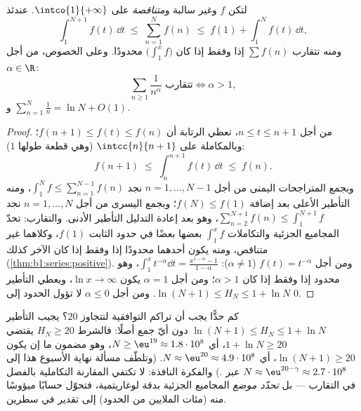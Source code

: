 \begin{theorem}\label{thm:b1:series:riemann}
لتكن $f$  وغير سالبة و\emph{متناقصة} على
$\intco{1}{+\infty}$. عندئذ
\[
\int_1^{N+1} f(t)\,\dd t \;\leq\; \sum_{n=1}^{N} f(n) \;\leq\; f(1)
+ \int_1^{N} f(t)\,\dd t ,
\]
ومنه تتقارب $\sum f(n)$ إذا وفقط إذا كان $\bigl(\int_1^x f\bigr)$ محدودًا. وعلى
الخصوص، من أجل $\alpha \in \R$:
\[
\sum_{n \geq 1} \frac{1}{n^\alpha} \text{ تتقارب}
\iff \alpha > 1,
\]
و $\sum_{n=1}^{N} \frac1n = \ln N + O(1)$.
\end{theorem}

\begin{proof}
من أجل $n \leq t \leq n+1$، تعطي الرتابة أن $f(n+1) \leq f(t)
\leq f(n)$؛ وبالمكاملة على $\intcc{n}{n+1}$ (وهي قطعة
طولها $1$):
\[
f(n+1) \;\leq\; \int_n^{n+1} f(t)\,\dd t \;\leq\; f(n) .
\]
وبجمع المتراجحات اليمنى من أجل $n = 1, \dots, N-1$ نجد
$\int_1^{N} f \leq \sum_{n=1}^{N-1} f(n)$، ومنه التأطير
الأعلى بعد إضافة $f(N) \leq f(1)$؛ وبجمع اليسرى من أجل
$n = 1, \dots, N$ نجد $\sum_{n=2}^{N+1} f(n) \leq
\int_1^{N+1} f$، وهو بعد إعادة التدليل التأطير الأدنى.
والتقارب: تحدّ المجاميع الجزئية والتكاملات $\int_1^x f$
بعضها بعضًا في حدود الثابت $f(1)$، وكلاهما
غير متناقص، ومنه يكون أحدهما محدودًا إذا وفقط إذا كان الآخر كذلك
(\cref{thm:b1:series:positive}). ومن أجل $f(t)
= t^{-\alpha}$ ($\alpha \neq 1$): $\int_1^x t^{-\alpha}\dd t =
\frac{x^{1-\alpha} - 1}{1 - \alpha}$، وهو محدود إذا وفقط إذا كان $\alpha > 1$؛ ومن أجل
$\alpha = 1$ يكون  $\ln x \to \infty$، ويعطي التأطير
$\ln(N+1) \leq H_N \leq 1 + \ln N$. ومن أجل $\alpha \leq 0$ لا تؤول
الحدود إلى $0$.
\end{proof}

\begin{example}\label{ex:b1:series:harmonicstack}
كم حدًّا يجب أن تراكم  التوافقية لتتجاوز $20$؟
يجيب التأطير $\ln(N+1) \leq H_N \leq 1 + \ln N$ دون أيّ
جمع أصلًا: فالشرط $H_N \geq 20$ يقتضي $1 + \ln N \geq 20$،
أي $N \geq \eu^{19} \approx 1.8\cdot10^{8}$، وهو مضمون
ما إن يكون $\ln(N + 1) \geq 20$، أي $N \approx \eu^{20} \approx
4.9\cdot10^{8}$. (وتلطّف مسألة نهاية الأسبوع هذا إلى $N \approx
\eu^{20 - \gamma} \approx 2.7\cdot10^{8}$ عبر .)
والفكرة النافذة: لا تكتفي المقارنة التكاملية بالفصل
في التقارب --- بل \emph{تحدّد موضع} المجاميع الجزئية بدقة
لوغاريتمية، فتحوّل حسابًا ميؤوسًا منه
(مئات الملايين من الحدود) إلى تقدير في سطرين.
\end{example}

